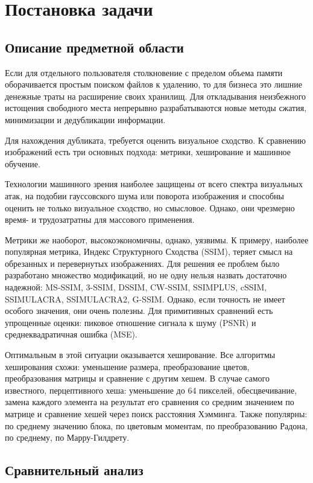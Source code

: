 \documentclass[variant=courcework]{bsuir}
\begin{document}
\chapter{Постановка задачи}

\section{Описание предметной области}

Если для отдельного пользователя столкновение с пределом объема памяти
оборачивается простым поиском файлов к удалению, то для бизнеса это лишние
денежные траты на расширение своих хранилищ. Для откладывания неизбежного
истощения свободного места непрерывно разрабатываются новые методы сжатия,
минимизации и дедубликации информации.

Для нахождения дубликата, требуется оценить визуальное сходство. К сравнению
изображений есть три основных подхода: метрики, хеширование и машинное обучение.

Технологии машинного зрения наиболее защищены от всего спектра визуальных атак,
на подобии гауссовского шума или поворота изображения и способны оценить не
только визуальное сходство, но смысловое. Однако, они чрезмерно время- и
трудозатратны для массового применения.

Метрики же наоборот, высокоэкономичны, однако, уязвимы. К примеру, наиболее
популярная метрика, Индекс Структурного Сходства (SSIM), теряет смысл на
обрезанных и перевернутых изображениях. Для решения ее проблем было разработано
множество модификаций, но не одну нельзя назвать достаточно надежной: MS-SSIM,
3-SSIM, DSSIM, CW-SSIM, SSIMPLUS, cSSIM, SSIMULACRA, SSIMULACRA2, G-SSIM.
Однако, если точность не имеет особого значения, они очень полезны. Для
примитивных сравнений есть упрощенные оценки: пиковое отношение сигнала к шуму
(PSNR) и среднеквадратичная ошибка (MSE).

Оптимальным в этой ситуации оказывается хеширование. Все алгоритмы хеширования
схожи: уменьшение размера, преобразование цветов, преобразования матрицы и
сравнение с другим хешем. В случае самого известного, перцептивного хеша:
уменьшение до 64 пикселей, обесцвечивание, замена каждого элемента на результат
его сравнения со средним значением по матрице и сравнение хешей через поиск
расстояния Хэмминга. Также популярны: по среднему значению блока, по цветовым
моментам, по преобразованию Радона, по среднему, по Марру-Гилдрету.

\section{Сравнительный анализ}
\end{document}
